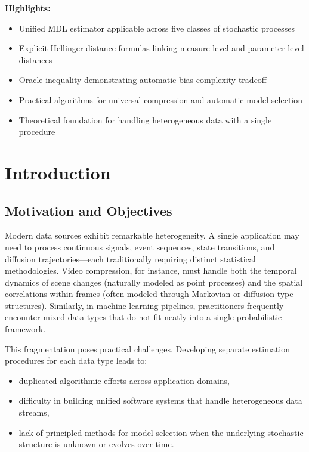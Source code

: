 \documentclass[preprint,review,12pt]{article}
\begin{document}
	\vspace{1em}
	\noindent\textbf{Highlights:}
	\begin{itemize}[leftmargin=2em]
		\item Unified MDL estimator applicable across five classes of stochastic processes
		\item Explicit Hellinger distance formulas linking measure-level and parameter-level distances
		\item Oracle inequality demonstrating automatic bias-complexity tradeoff
		\item Practical algorithms for universal compression and automatic model selection
		\item Theoretical foundation for handling heterogeneous data with a single procedure
	\end{itemize}
	
	\section{Introduction}
	\label{sec:intro}
	
	\subsection{Motivation and Objectives}
	
	Modern data sources exhibit remarkable heterogeneity. A single application 
	may need to process continuous signals, event sequences, state transitions, 
	and diffusion trajectories---each traditionally requiring distinct statistical 
	methodologies. Video compression, for instance, must handle both the temporal 
	dynamics of scene changes (naturally modeled as point processes) and the 
	spatial correlations within frames (often modeled through Markovian or 
	diffusion-type structures). Similarly, in machine learning pipelines, 
	practitioners frequently encounter mixed data types that do not fit neatly 
	into a single probabilistic framework.
	
	This fragmentation poses practical challenges. Developing separate estimation 
	procedures for each data type leads to:
	\begin{itemize}[leftmargin=2em]
		\item duplicated algorithmic efforts across application domains,
		\item difficulty in building unified software systems that handle 
		heterogeneous data streams,
		\item lack of principled methods for model selection when the underlying 
		stochastic structure is unknown or evolves over time.
	\end{itemize}
	
\end{document}
